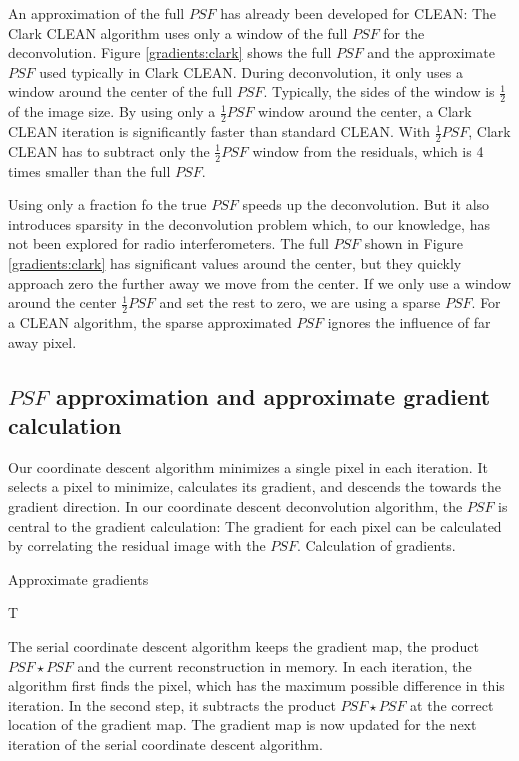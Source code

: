 An approximation of the full $PSF$ has already been developed for CLEAN: The Clark CLEAN algorithm \cite{clark1980efficient} uses only a window of the full $PSF$ for the deconvolution. Figure \ref{gradients:clark} shows the full $PSF$ and the approximate $PSF$ used typically in Clark CLEAN. During deconvolution, it only uses a window around the center of the full $PSF$. Typically, the sides of the window is $\frac{1}{2}$ of the image size. By using only a $\frac{1}{2} PSF$ window around the center, a Clark CLEAN iteration is significantly faster than standard CLEAN. With $\frac{1}{2} PSF$, Clark CLEAN has to subtract only the $\frac{1}{2} PSF$ window from the residuals, which is 4 times smaller than the full $PSF$.

Using only a fraction fo the true $PSF$ speeds up the deconvolution. But it also introduces sparsity in the deconvolution problem which, to our knowledge, has not been explored for radio interferometers. The full $PSF$ shown in Figure \ref{gradients:clark} has significant values around the center, but they quickly approach zero the further away we move from the center. If we only use a window around the center $\frac{1}{2} PSF$ and set the rest to zero, we are using a sparse $PSF$. For a CLEAN algorithm, the sparse approximated $PSF$ ignores the influence of far away pixel.

\subsection{$PSF$ approximation and approximate gradient calculation}
Our coordinate descent algorithm minimizes a single pixel in each iteration. It selects a pixel to minimize, calculates its gradient, and descends the towards the gradient direction. In our coordinate descent deconvolution algorithm, the $PSF$ is central to the gradient calculation: The gradient for each pixel can be calculated by correlating the residual image with the $PSF$. 
Calculation of gradients.

Approximate gradients

T

The serial coordinate descent algorithm keeps the gradient map, the product $PSF \star PSF$ and the current reconstruction in memory. In each iteration, the algorithm first finds the pixel, which has the maximum possible difference in this iteration. In the second step, it subtracts the product $PSF \star PSF$ at the correct location of the gradient map. The gradient map is now updated for the next iteration of the serial coordinate descent algorithm.

